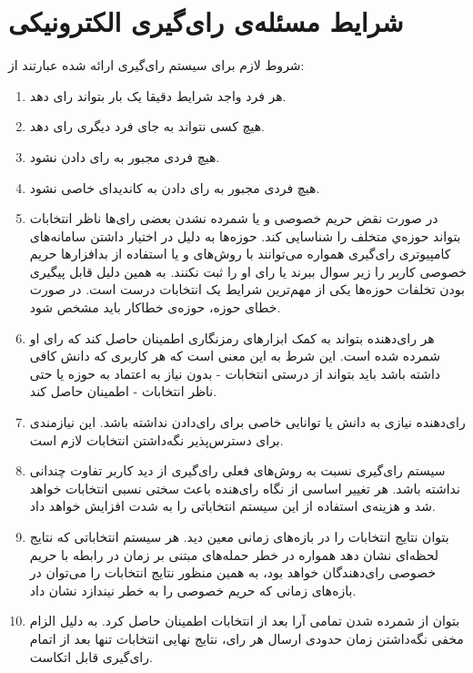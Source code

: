 \section{شرایط مسئله‌ی رای‌گیری الکترونیکی}
شروط لازم برای سیستم‌ رای‌گیری ارائه شده عبارتند از:  
\begin{enumerate}
	\item 
	هر فرد واجد شرایط دقیقا یک بار بتواند رای دهد.
	\item 
	هیچ کسی نتواند به جای فرد دیگری رای دهد.
	\item 
	هیچ فردی مجبور به رای دادن نشود.
	\item 
	هیچ فردی مجبور به رای دادن به کاندیدای خاصی نشود.
	\item 
	در صورت نقض حریم خصوصی و یا شمرده نشدن بعضی رای‌ها ناظر انتخابات بتواند حوزه‌ي متخلف را شناسایی کند. حوزه‌ها به دلیل در اختیار داشتن سامانه‌های کامپیوتری رای‌گیری همواره می‌توانند با روش‌های 
	و یا استفاده از بد‌افزار‌ها حریم خصوصی کاربر را زیر سوال ببرند یا رای او را ثبت نکنند. به همین دلیل قابل پیگیری بودن تخلفات حوزه‌ها یکی از مهم‌ترین شرایط یک انتخابات درست است. در صورت خطای حوزه، حوزه‌ی خطاکار باید مشخص شود.
	\item 
	هر رای‌دهنده بتواند به کمک ابزارهای رمزنگاری اطمینان حاصل کند که رای او شمرده شده است. این شرط به این معنی است که هر کاربری که دانش کافی داشته باشد باید بتواند از درستی انتخابات - بدون نیاز به اعتماد به حوزه یا حتی ناظر انتخابات - اطمینان حاصل کند. 
	\item
	رای‌دهنده نیازی به دانش یا توانایی خاصی برای رای‌دادن نداشته باشد. این نیازمندی برای دسترس‌پذیر نگه‌داشتن انتخابات لازم است.
	\item
	سیستم رای‌گیری نسبت به روش‌های فعلی رای‌گیری از دید کاربر تفاوت چندانی نداشته باشد. هر تغییر اساسی از نگاه رای‌هنده باعث سختی نسبی انتخابات خواهد شد و هزینه‌ی  استفاده از این سیستم انتخاباتی را به شدت افزایش خواهد داد.
	\item 
	بتوان نتایج انتخابات را در بازه‌های زمانی معین دید. هر سیستم انتخاباتی که نتایج لحظه‌ای نشان دهد همواره در خطر حمله‌های مبتنی بر زمان در رابطه با حریم خصوصی رای‌دهندگان خواهد بود، به همین منظور نتایج انتخابات را می‌توان در بازه‌های زمانی که حریم خصوصی را به خطر نیندازد نشان داد.
	\item 
	بتوان از شمرده شدن تمامی آرا بعد از انتخابات اطمینان حاصل کرد. به دلیل الزام مخفی نگه‌داشتن زمان حدودی ارسال هر رای، نتایج نهایی انتخابات تنها بعد از اتمام رای‌گیری قابل اتکاست.
\end{enumerate}

